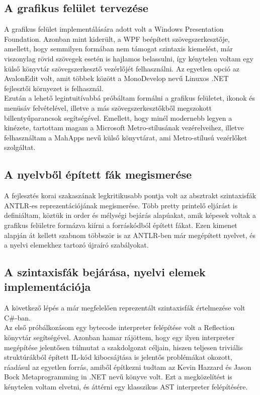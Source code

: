 \documentclass[a4paper,12pt]{report}
\begin{document}
\subsection{A grafikus felület tervezése}
A grafikus felület implementálására adott volt a Windows Presentation Foundation. Azonban mint kiderült, a WPF beépített szövegszerkesztője, amellett, hogy semmilyen formában nem támogat szintaxis kiemelést, már viszonylag rövid szövegek esetén is hajlamos belassulni, így kénytelen voltam egy külső könyvtár szövegszerkesztő vezérlőjét felhasználni. Az egyetlen opció az AvalonEdit\cite{avalon} volt, amit többek között a MonoDevelop nevű Linuxos .NET fejlesztői környezet is felhasznál. \\
Ezután a lehető legintuitívabbá próbáltam formálni a grafikus felületet, ikonok és menüsáv felvételével, illetve a más szövegszerkesztőkből megszokott billentyűparancsok segítségével. Emellett, hogy minél modernebb legyen a kinézete, tartottam magam a Microsoft Metro-stílusának vezérelveihez, illetve felhasználtam a MahApps \cite{mahapps} nevű külső könyvtárat, ami Metro-stílusú vezérlőket szolgáltat.

\subsection{A nyelvből épített fák megismerése}
A fejlesztés korai szakaszának legkritikusabb pontja volt az absztrakt szintaxisfák ANTLR-es reprezentációjának megismerése. Több pretty printelő eljárást is definiáltam, köztük in order és mélységi bejárás alapúakat, amik képesek voltak a grafikus felületre formázva kiírni a forráskódból épített fákat. Ezen kimenet alapján át kellett szabnom többször is az ANTLR-ben már megépített nyelvet, és a nyelvi elemekhez tartozó újraíró szabályokat. 

\subsection{A szintaxisfák bejárása, nyelvi elemek implementációja}
A következő lépés a már megfelelően reprezentált szintaxisfák értelmezése volt C\#-ban. \\
Az első próbálkozásom egy bytecode interpreter felépítése volt a Reflection könyvtár segítségével. Azonban hamar rájöttem, hogy egy ilyen interpreter megépítése jelentősen túlmutat a szakdolgozat céljain, hiszen teljesen triviális struktúrákból épített IL-kód kibocsájtása is jelentős problémákat okozott, ráadásul az egyetlen forrás, amiből építkezni tudtam az Kevin Hazzard és Jason Bock Metaprogramming in .NET\cite{metaprog} nevű könyve volt. Ezt a megközelítést is kénytelen voltam elvetni, és áttérni egy klasszikus AST interpreter felépítésére. \\
\end{document}
